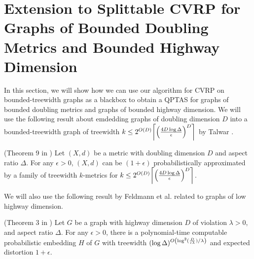 \documentclass[twoside,leqno]{article}
\newcommand{\eps}{\epsilon}
\DeclarePairedDelimiter\ceil{\lceil}{\rceil}
\DeclarePairedDelimiter\autobracket{(}{)}
\newcommand{\br}[1]{\autobracket*{#1}}
\begin{document}
\section{Extension to Splittable CVRP for Graphs of Bounded Doubling Metrics and Bounded Highway Dimension}
In this section, we will show how we can use our algorithm for CVRP on bounded-treewidth graphs as a blackbox to obtain a QPTAS for graphs of bounded doubling metrics and graphs of bounded highway dimension.  We will use the following result about emdedding graphs of doubling dimension $D$ into a bounded-treewidth graph of treewidth $k \le 2^{O(D)}\ceil*{\br{\frac{4D\log \Delta}{\eps}}^D}$ by Talwar \cite{Talwar-embedding}. 
\begin{lemma}\label{lem:doubling-embed}
(Theorem 9 in \cite{Talwar-embedding}) Let $(X,d)$ be a metric with doubling dimension $D$ and aspect ratio $\Delta$. For any $\eps > 0$, $(X,d)$ can be $(1 + \eps)$ probabilistically approximated by a family of treewidth $k$-metrics for $k \le 2^{O(D)}\ceil*{\br{\frac{4D\log \Delta}{\eps}}^D}$.
\end{lemma}
We will also use the following result by Feldmann et al. \cite{FeldmannFKP15-embedding} related to graphs of low highway dimension. 
\begin{lemma}\label{lem:highway-embe}
(Theorem 3 in \cite{FeldmannFKP15-embedding}) Let $G$ be a graph with highway dimension $D$ of violation $\lambda > 0$, and aspect ratio $\Delta$. For any $\eps > 0$, there is a polynomial-time computable probabilistic embedding $H$ of $G$ with treewidth $(\log \Delta)^{O\br{\log^2(\frac{D}{\eps \lambda})/\lambda}}$ and expected distortion $1 + \eps$. \end{lemma}
\end{document}
